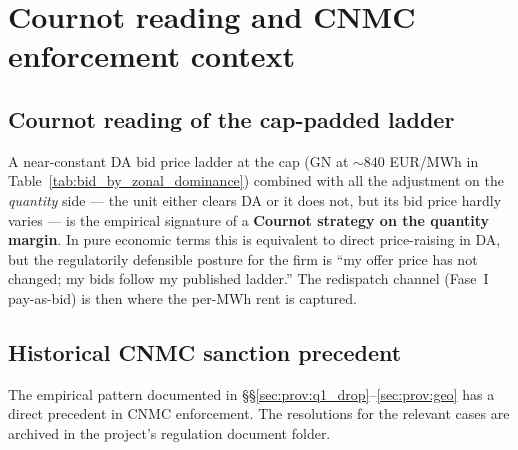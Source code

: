 \documentclass[11pt,a4paper]{article}
\begin{document}
\section{Cournot reading and CNMC enforcement context}\label{sec:prov:cournot_cnmc}

\subsection{Cournot reading of the cap-padded ladder}\label{sec:prov:cournot_cnmc:cournot}

A near-constant DA bid price ladder at the cap (GN at $\sim 840$ EUR/MWh in Table~\ref{tab:bid_by_zonal_dominance}) combined with all the adjustment on the \emph{quantity} side --- the unit either clears DA or it does not, but its bid price hardly varies --- is the empirical signature of a \textbf{Cournot strategy on the quantity margin}. In pure economic terms this is equivalent to direct price-raising in DA, but the regulatorily defensible posture for the firm is ``my offer price has not changed; my bids follow my published ladder.'' The redispatch channel (Fase~I pay-as-bid) is then where the per-MWh rent is captured.

\subsection{Historical CNMC sanction precedent}\label{sec:prov:cournot_cnmc:sanctions}

The empirical pattern documented in \S\S\ref{sec:prov:q1_drop}--\ref{sec:prov:geo} has a direct precedent in CNMC enforcement. The resolutions for the relevant cases are archived in the project's regulation document folder.
\end{document}
